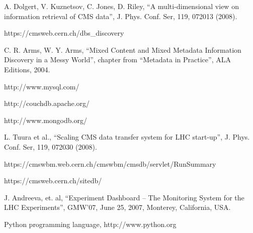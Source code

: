 \documentclass[1p,times]{elsarticle}
\begin{document}
\begin{thebibliography}{00}
A. Dolgert, V. Kuznetsov, C. Jones, D. Riley, 
``A multi-dimensional view on information retrieval of CMS data'',
J. Phys. Conf. Ser, 119, 072013 (2008).

 https://cmsweb.cern.ch/dbs\_discovery

C. R. Arms, W. Y. Arms,
 ``Mixed Content and Mixed Metadata 
Information Discovery in a Messy World'',
chapter from ``Metadata in Practice'', ALA Editions, 2004.

http://www.mysql.com/

http://couchdb.apache.org/

http://www.mongodb.org/


L. Tuura et al., 
``Scaling CMS data transfer system for LHC start-up'', 
J. Phys. Conf. Ser, 119, 072030 (2008).

https://cmswbm.web.cern.ch/cmswbm/cmsdb/servlet/RunSummary

https://cmsweb.cern.ch/sitedb/




J. Andreeva, et. al,
``Experiment Dashboard – The Monitoring System for the LHC Experiments'',
GMW’07, June 25, 2007, Monterey, California, USA.


 Python programming language, http://www.python.org

\end{thebibliography}
\end{document}
